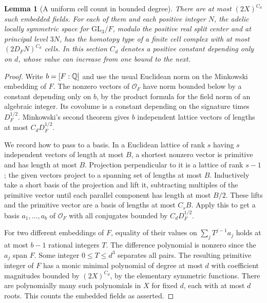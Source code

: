 \documentclass[a4paper,11pt]{article}
\newtheorem{lemma}[proposition]{Lemma}
\theoremstyle{definition}
\theoremstyle{remark}
\numberwithin{equation}{section}
\begin{document}
\begin{lemma}[A uniform cell count in bounded degree]\leavevmode
\label{lem:cmcells403}
There are at most \((2X)^{C_d}\) such embedded fields. For each
of them and each positive integer \(N\), the adelic locally
symmetric space for \(\mathrm{GL}_3/F\), modulo the positive
real split center and at principal level \(3N\), has the homotopy
type of a finite cell complex with at most \((2D_FN)^{C_d}\) cells.
In this section \(C_d\) denotes a positive constant depending
only on \(d\), whose value can increase from one bound to the next.
\end{lemma}
\begin{proof}
Write \(b=[F:\mathbb Q]\) and use the usual Euclidean norm on the
Minkowski embedding of \(F\). The nonzero vectors of
\(\mathcal O_F\) have norm bounded below by a constant depending
only on \(b\), by the product formula for the field norm of an
algebraic integer. Its covolume is a constant depending on the
signature times \(D_F^{1/2}\). Minkowski's second theorem gives
\(b\) independent lattice vectors of lengths at most
\(C_d D_F^{1/2}\).

We record how to pass to a basis. In a Euclidean lattice of rank
\(s\) having \(s\) independent vectors of length at most \(B\),
a shortest nonzero vector is primitive and has length at most
\(B\). Projection perpendicular to it is a lattice of rank
\(s-1\); the given vectors project to a spanning set of lengths
at most \(B\). Inductively take a short basis of the projection
and lift it, subtracting multiples of the primitive vector until
each parallel component has length at most \(B/2\). These lifts
and the primitive vector are a basis of lengths at most
\(C_s B\). Apply this to get a basis \(a_1,\ldots,a_b\) of
\(\mathcal O_F\) with all conjugates bounded by \(C_dD_F^{1/2}\).

For two different embeddings of \(F\), equality of their values
on \(\sum_j T^{j-1}a_j\) holds at at most \(b-1\) rational
integers \(T\). The difference polynomial is nonzero since the
\(a_j\) span \(F\). Some integer \(0\le T\le d^3\) separates
all pairs. The resulting primitive integer of \(F\) has a monic
minimal polynomial of degree at most \(d\) with coefficient
magnitudes bounded by \((2X)^{C_d}\), by the elementary symmetric
functions. There are polynomially many such polynomials in \(X\)
for fixed \(d\), each with at most \(d\) roots. This counts the
embedded fields as asserted.


\end{proof}
\end{document}
